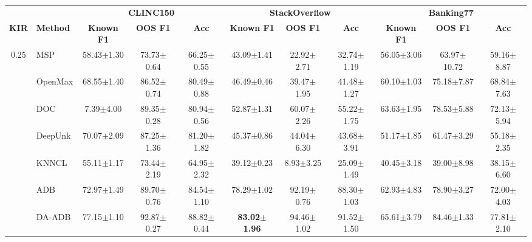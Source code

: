 \documentclass[11pt]{article}
\begin{document}
\begin{table}[!t]
\centering
\fontsize{7.5}{6.9}\selectfont
\setlength{\tabcolsep}{2pt}
\renewcommand{\arraystretch}{1}

\begin{tabular*}{\textwidth}{
@{\extracolsep{\fill}}
c l
ccc
ccc
ccc
@{}
}
\toprule
&
& \multicolumn{3}{c}{\textbf{CLINC150}}
& \multicolumn{3}{c}{\textbf{StackOverflow}}
& \multicolumn{3}{c}{\textbf{Banking77}} \\
\cmidrule(lr){3-5}
\cmidrule(lr){6-8}
\cmidrule(lr){9-11}

\textbf{KIR}
& \textbf{Method}
& \textbf{Known F1} & \textbf{OOS F1} & \textbf{Acc}
& \textbf{Known F1} & \textbf{OOS F1} & \textbf{Acc}
& \textbf{Known F1} & \textbf{OOS F1} & \textbf{Acc} \\
\midrule

\multirow{9}{*}{0.25}
& MSP
& 58.43$\pm$1.30 & 73.73$\pm$0.64 & 66.25$\pm$0.55
& 43.09$\pm$1.41 & 22.92$\pm$2.71 & 32.74$\pm$1.19
& 56.05$\pm$3.06 & 63.97$\pm$10.72 & 59.16$\pm$8.87 \\

& OpenMax
& 68.55$\pm$1.40 & 86.52$\pm$0.74 & 80.49$\pm$0.88
& 46.49$\pm$0.46 & 39.47$\pm$1.95 & 41.48$\pm$1.27
& 60.10$\pm$1.03 & 75.18$\pm$7.87 & 68.84$\pm$7.63 \\

& DOC
& 7.39$\pm$4.00 & 89.35$\pm$0.28 & 80.94$\pm$0.56
& 52.87$\pm$1.31 & 60.07$\pm$2.26 & 55.22$\pm$1.75
& 63.63$\pm$1.95 & 78.53$\pm$5.88 & 72.13$\pm$5.94 \\

& DeepUnk
& 70.07$\pm$2.09 & 87.25$\pm$1.36 & 81.20$\pm$1.82
& 45.37$\pm$0.86 & 44.04$\pm$6.30 & 43.68$\pm$3.91
& 51.17$\pm$1.85 & 61.47$\pm$3.29 & 55.18$\pm$2.35 \\

& KNNCL
& 55.11$\pm$1.17 & 73.44$\pm$2.19 & 64.95$\pm$2.32
& 39.12$\pm$0.23 & 8.93$\pm$3.25 & 25.09$\pm$1.49
& 40.45$\pm$3.18 & 39.00$\pm$8.98 & 38.15$\pm$6.60 \\

& ADB
& 72.97$\pm$1.49 & 89.70$\pm$0.76 & 84.54$\pm$1.10
& 78.29$\pm$1.02 & 92.19$\pm$0.76 & 88.30$\pm$1.03
& 62.93$\pm$4.83 & 78.90$\pm$3.27 & 72.00$\pm$4.03 \\

& DA-ADB
& 77.15$\pm$1.10 & 92.87$\pm$0.27 & 88.82$\pm$0.44
& \textbf{83.02$\pm$1.96} & 94.46$\pm$1.02 & 91.52$\pm$1.50
& 65.61$\pm$3.79 & 84.46$\pm$1.33 & 77.81$\pm$2.10 \\


\end{tabular*}
\end{table}
\end{document}
